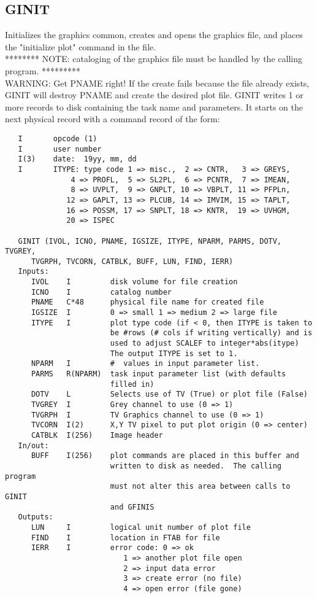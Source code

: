 \subsection{GINIT}
Initializes the graphics common, creates and opens the
graphics file, and places the "initialize plot" command in the file.\\
********  NOTE: cataloging of the graphics file must be handled by
the calling program.  *********\\
WARNING: Get PNAME right!  If the create fails because the file
already exists, GINIT will destroy PNAME and create the desired
plot file.
GINIT writes 1 or more records to disk containing the task name and
parameters.  It starts on the next physical record with a command
record of the form:
\begin{verbatim}
   I       opcode (1)
   I       user number
   I(3)    date:  19yy, mm, dd
   I       ITYPE: type code 1 => misc.,  2 => CNTR,   3 => GREYS,
               4 => PROFL,  5 => SL2PL,  6 => PCNTR,  7 => IMEAN,
               8 => UVPLT,  9 => GNPLT, 10 => VBPLT, 11 => PFPLn,
              12 => GAPLT, 13 => PLCUB, 14 => IMVIM, 15 => TAPLT,
              16 => POSSM, 17 => SNPLT, 18 => KNTR,  19 => UVHGM,
              20 => ISPEC

   GINIT (IVOL, ICNO, PNAME, IGSIZE, ITYPE, NPARM, PARMS, DOTV, TVGREY,
      TVGRPH, TVCORN, CATBLK, BUFF, LUN, FIND, IERR)
   Inputs:
      IVOL    I         disk volume for file creation
      ICNO    I         catalog number
      PNAME   C*48      physical file name for created file
      IGSIZE  I         0 => small 1 => medium 2 => large file
      ITYPE   I         plot type code (if < 0, then ITYPE is taken to
                        be #rows (# cols if writing vertically) and is
                        used to adjust SCALEF to integer*abs(itype)
                        The output ITYPE is set to 1.
      NPARM   I         #  values in input parameter list.
      PARMS   R(NPARM)  task input parameter list (with defaults
                        filled in)
      DOTV    L         Selects use of TV (True) or plot file (False)
      TVGREY  I         Grey channel to use (0 => 1)
      TVGRPH  I         TV Graphics channel to use (0 => 1)
      TVCORN  I(2)      X,Y TV pixel to put plot origin (0 => center)
      CATBLK  I(256)    Image header
   In/out:
      BUFF    I(256)    plot commands are placed in this buffer and
                        written to disk as needed.  The calling program
                        must not alter this area between calls to GINIT
                        and GFINIS
   Outputs:
      LUN     I         logical unit number of plot file
      FIND    I         location in FTAB for file
      IERR    I         error code: 0 => ok
                           1 => another plot file open
                           2 => input data error
                           3 => create error (no file)
                           4 => open error (file gone)

\end{verbatim}

